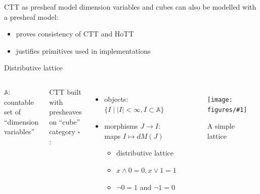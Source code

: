 \documentclass[english, draft]{beamer}
\newcommand{\fig}[2]{
    \begin{figure}\begin{center}\texttt{[image: figures/\#1]}\caption{#2\label{#1}}\end{center}
    \end{figure}}
\begin{document}
\begin{frame}{CTT as presheaf model}
    dimension variables and cubes can also be modelled with a presheaf model:
    \begin{itemize}
        \item proves consistency of CTT and HoTT
        \item justifies primitives used in implementations
    \end{itemize}


\end{frame}

\begin{frame}{Distributive lattice}

%  
%  


  \begin{columns}[c]
        $\mathbb{A}$: countable set of ``dimension variables'' 

        CTT built with presheaves on ``cube'' category $\square$: 
        \begin{itemize}
            \item objects: $\{ I \mid |I| < \infty , I \subset \mathbb{A} \}$
            \item morphisms $J\rightarrow I$: maps $I \mapsto dM(J)$
            \begin{itemize}
                \item distributive lattice
                \item  $x \wedge 0 = 0, x\vee 1 = 1$
                \item $\neg 0 = 1$ and $ \neg 1 =0$
            \end{itemize}
        \end{itemize}

        \fig{lattice}{A simple lattice}
\end{columns}
 
 
\end{frame}
\end{document}
